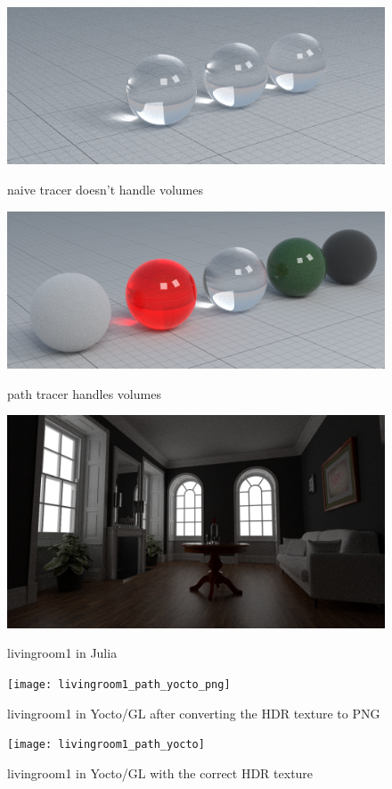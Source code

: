 \documentclass[12pt]{report}
\begin{document}
    \begin{figure}[h]
        \caption{naive tracer doesn't handle volumes}
        \includegraphics[width=\textwidth]{materials4_naive}
        \centering
        \label{fig:materials4_naive}
    \end{figure}
    \begin{figure}[h]
        \caption{path tracer handles volumes}
        \includegraphics[width=\textwidth]{materials4_path}
        \centering
        \label{fig:materials4_path}
    \end{figure}

    \begin{figure}[h]
        \caption{livingroom1 in Julia}
        \includegraphics[width=\textwidth]{livingroom1_path}
        \label{fig:livingroom1_path}
        \centering
    \end{figure}
    \begin{figure}[h]
        \caption{livingroom1 in Yocto/GL after converting the HDR texture to PNG}
        \texttt{[image: livingroom1\_path\_yocto\_png]}
        \label{fig:livingroom1_yocto_png}
        \centering
    \end{figure}
    \begin{figure}[h]
        \caption{livingroom1 in Yocto/GL with the correct HDR texture}
        \texttt{[image: livingroom1\_path\_yocto]}
        \label{fig:livingroom1_yocto}
        \centering
    \end{figure}
\end{document}
